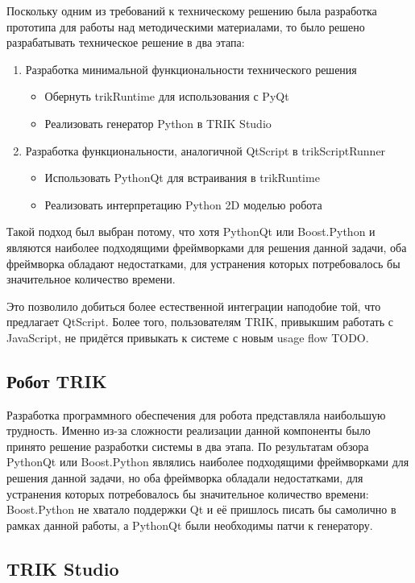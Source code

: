 \documentclass[14pt]{matmex-diploma-custom}
\begin{document}
Поскольку одним из требований к техническому решению была разработка прототипа для работы над методическими материалами, то было решено разрабатывать техническое решение в два этапа:
\begin{enumerate}
    \item Разработка минимальной функциональности технического решения
    \begin{itemize}
        \item Обернуть trikRuntime для использования с PyQt
        \item Реализовать генератор Python в TRIK Studio
    \end{itemize}
    \item Разработка функциональности, аналогичной QtScript в trikScriptRunner
    \begin{itemize}
        \item Использовать PythonQt для встраивания в trikRuntime
        \item Реализовать интерпретацию Python 2D моделью робота
    \end{itemize}
\end{enumerate} 

Такой подход был выбран потому, что хотя PythonQt или Boost.Python и являются наиболее подходящими фреймворками для решения данной задачи, оба фреймворка обладают недостатками, для устранения которых потребовалось бы значительное количество времени. 

Это позволило добиться более естественной интеграции наподобие той, что предлагает QtScript. Более того, пользователям TRIK, привыкшим работать с JavaScript, не придётся привыкать к системе с новым usage flow TODO. 

\subsection{Робот TRIK}
Разработка программного обеспечения для робота представляла наибольшую трудность. Именно из-за сложности реализации данной компоненты было принято решение разработки системы в два этапа. По результатам обзора PythonQt или Boost.Python являлись наиболее подходящими фреймворками для решения данной задачи, но оба фреймворка обладали недостатками, для устранения которых потребовалось бы значительное количество времени: Boost.Python не хватало поддержки Qt и её пришлось писать бы самолично в рамках данной работы, а PythonQt были необходимы патчи к генератору.   

\subsection{TRIK Studio}
\end{document}
